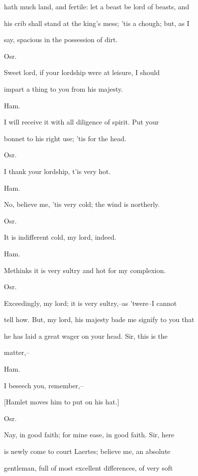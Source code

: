 \documentclass[12pt]{book}
\begin{document}
hath much land, and fertile: let a beast be lord of beasts, and

his crib shall stand at the king's mess; 'tis a chough; but, as I

say, spacious in the possession of dirt.



Osr.

Sweet lord, if your lordship were at leisure, I should

impart a thing to you from his majesty.



Ham.

I will receive it with all diligence of spirit. Put your

bonnet to his right use; 'tis for the head.



Osr.

I thank your lordship, t'is very hot.



Ham.

No, believe me, 'tis very cold; the wind is northerly.



Osr.

It is indifferent cold, my lord, indeed.



Ham.

Methinks it is very sultry and hot for my complexion.



Osr.

Exceedingly, my lord; it is very sultry,--as 'twere--I cannot

tell how. But, my lord, his majesty bade me signify to you that

he has laid a great wager on your head. Sir, this is the

matter,--



Ham.

I beseech you, remember,--

[Hamlet moves him to put on his hat.]



Osr.

Nay, in good faith; for mine ease, in good faith. Sir, here

is newly come to court Laertes; believe me, an absolute

gentleman, full of most excellent differences, of very soft
\end{document}
